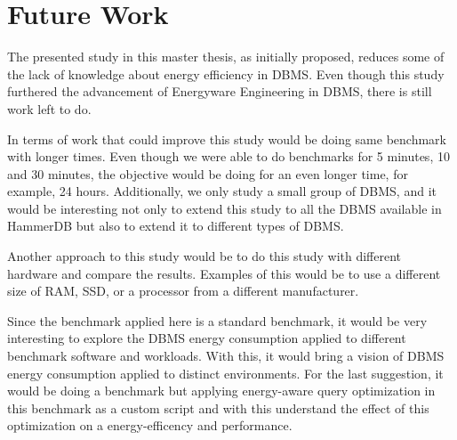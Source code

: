 \section{Future Work}


The presented study in this master thesis, as initially proposed, reduces some of the lack of knowledge about energy efficiency in DBMS.  Even though this study furthered the advancement of Energyware Engineering in DBMS, there is still work left to do.  

In terms of work that could improve this study would be doing same benchmark with longer times. Even though we were able to do benchmarks for 5 minutes, 10 and 30 minutes, the objective would be doing for an even longer time, for example, 24 hours. Additionally, we only study a small group of DBMS, and it would be interesting not only to extend this study to all the DBMS available in HammerDB but also to extend it to different types of DBMS.

Another approach to this study would be to do this study with different hardware and compare the results. Examples of this would be to use a different size of RAM, SSD, or a processor from a different manufacturer.

Since the benchmark applied here is a standard benchmark, it would be very interesting to explore the DBMS energy consumption applied to different benchmark software and workloads. With this, it would bring a vision of DBMS energy consumption applied to distinct environments. For the last suggestion, it would be doing a benchmark but applying energy-aware query optimization in this benchmark as a custom script and with this understand the effect of this optimization on a energy-efficency and performance.

